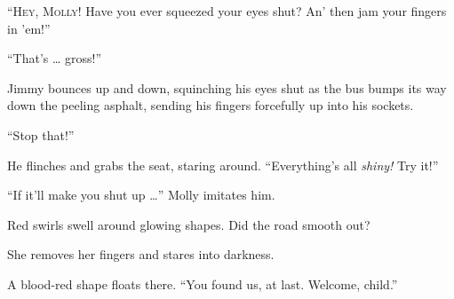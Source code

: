 
\lettrine{``H}{ey, Molly!} Have you ever squeezed your eyes shut? An' then jam your
fingers in 'em!''

``That's \ldots{} gross!''

Jimmy bounces up and down, squinching his eyes shut as the bus bumps its
way down the peeling asphalt, sending his fingers forcefully up into his
sockets.

``Stop that!''

He flinches and grabs the seat, staring around. ``Everything's all
\emph{shiny!} Try it!''

``If it'll make you shut up \ldots{}'' Molly imitates him.

Red swirls swell around glowing shapes. Did the road smooth out?

She removes her fingers and stares into darkness.

A blood-red shape floats there. ``You found us, at last. Welcome,
child.''
